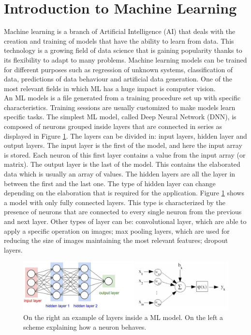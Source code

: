 \documentclass[12pt]{report}
\begin{document}
\section{Introduction to Machine Learning}
Machine learning is a branch of Artificial Intelligence (AI) that deals with the creation and training of models that have the ability to learn from data. This technology is a growing field of data science that is gaining popularity thanks to its flexibility to adapt to many problems. Machine learning models can be trained for different purposes such as regression of unknown systems, classification of data, predictions of data behaviour and artificial data generation. One of the most relevant fields in which ML has a huge impact is computer vision.\\
An ML models is a file generated from a training procedure set up with specific characteristics. Training sessions are usually customized to make models learn specific tasks. The simplest ML model, called Deep Neural Network (DNN), is composed of neurons grouped inside layers that are connected in series as displayed in Figure \ref{fig:modelstructure}. The layers can be divided in: input layers, hidden layer and output layers. The input layer is the first of the model, and here the input array is stored. Each neuron of this first layer contains a value from the input array (or matrix). The output layer is the last of the model. This contains the elaborated data which is usually an array of values. The hidden layers are all the layer in between the first and the last one. The type of hidden layer can change depending on the elaboration that is required for the application. Figure \ref{fig:modelstructure} shows a model with only fully connected layers. This type is characterized by the presence of neurons that are connected to every single neuron from the previous and next layer. Other types of layer can be: convolutional layer, which are able to apply a specific operation on images; max pooling layers, which are used for reducing the size of images maintaining the most relevant features; dropout layers.\\

\begin{figure}[h!]
    \centering
    \includegraphics[width=140mm]{Figures/Chapter1/modelstructure.jpeg} 
    \caption{On the right an example of layers inside a ML model. On the left a scheme explaining how a neuron behaves.}
    \label{fig:modelstructure}    
\end{figure}
\end{document}
